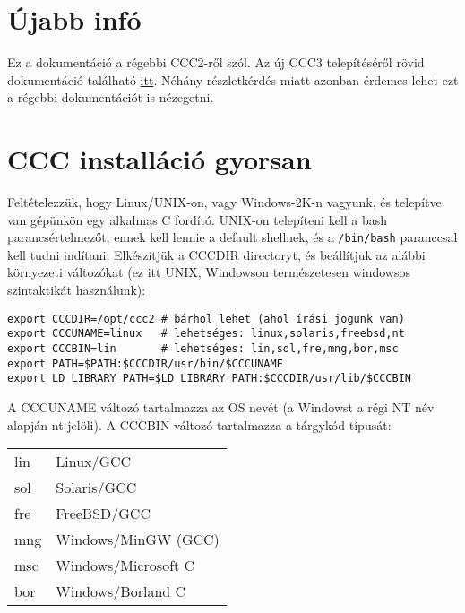 



\section{Újabb infó}

Ez a dokumentáció a régebbi CCC2-ről szól.
Az új CCC3 telepítéséről rövid dokumentáció található 
\href{http://ccc.comfirm.hu/ccc3/download/olvass.html}{itt}.
Néhány részletkérdés miatt azonban érdemes lehet ezt a régebbi
dokumentációt is nézegetni.

\section{CCC installáció gyorsan}

Feltételezzük, hogy Linux/UNIX-on, vagy Windows-2K-n vagyunk,
és telepítve van gépünkön egy alkalmas C fordító. 
UNIX-on telepíteni kell a bash parancsértelmezőt,
ennek kell lennie a default shellnek, és a \verb!/bin/bash!
paranccsal kell tudni indítani.
Elkészítjük a CCCDIR directoryt, és beállítjuk az alábbi
környezeti változókat (ez itt UNIX, Windowson természetesen
windowsos szintaktikát használunk):
\begin{verbatim}
export CCCDIR=/opt/ccc2 # bárhol lehet (ahol írási jogunk van)
export CCCUNAME=linux   # lehetséges: linux,solaris,freebsd,nt
export CCCBIN=lin       # lehetséges: lin,sol,fre,mng,bor,msc
export PATH=$PATH:$CCCDIR/usr/bin/$CCCUNAME
export LD_LIBRARY_PATH=$LD_LIBRARY_PATH:$CCCDIR/usr/lib/$CCCBIN
\end{verbatim}

A CCCUNAME változó tartalmazza az OS nevét (a Windowst a régi NT 
név alapján nt jelöli). A CCCBIN változó tartalmazza a tárgykód típusát:
\begin{center}
\begin{tabular}{|l|l|}
     lin & Linux/GCC \\
     sol & Solaris/GCC \\
     fre & FreeBSD/GCC \\
     mng & Windows/MinGW (GCC) \\
     msc & Windows/Microsoft C \\
     bor & Windows/Borland C \\
\end{tabular}
\end{center}


